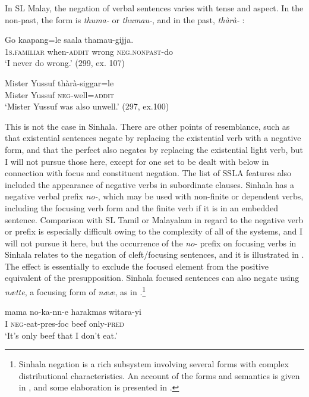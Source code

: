  In SL Malay, the negation of verbal sentences varies with tense and aspect. In the non-past, the form is \textit{thuma-} or \textit{thumau-},   and in the past, \textit{thàrà-} :


\ea\label{ex3.10.7} 
\gll Go kaapang=le saala thamau-gijja.\\
 1\textsc{s.familiar} when-\textsc{addit} wrong \textsc{neg.nonpast}-do\\
 `I never do wrong.'   (299, ex. 107)
\z


 

\ea\label{ex3.10.8}
\gll Mister Yussuf thàrà-siggar=le\\
 Mister  Yussuf \textsc{neg}-well=\textsc{addit}\\
 `Mister Yussuf was also unwell.'  (297, ex.100)
\z


This is not the case in Sinhala.
 There are other points of resemblance, such as that existential sentences negate by replacing the existential verb with a negative form, and that the perfect also negates by replacing the existential light verb, but I will not pursue those here, except for one set to be dealt with below in connection with focus and constituent negation.
 The list of SSLA features also included the appearance of negative verbs in subordinate clauses.  Sinhala has a negative verbal prefix \textit{no-}, which may be used with non-finite or dependent verbs, including the focusing verb form and the finite verb if it is in an embedded sentence. Comparison with SL Tamil or Malayalam in regard to the negative verb or prefix is especially  difficult owing to the complexity of all of the  systems, and I will not pursue it here, but the occurrence of the \textit{no}-  prefix on focusing verbs in Sinhala relates to the negation of cleft/focusing sentences, and it is illustrated in . The effect is essentially to exclude the focused element from the positive equivalent of the presupposition. Sinhala focused sentences can also negate using \textit{n{\ae}tte}, a focusing form of \textit{n{\ae}{\ae}}, as in .\footnote{Sinhala
  negation is a rich subsystem involving several forms with complex distributional characteristics. An account of the forms and semantics is given in \citet{DeAbrew1981}, and some elaboration is presented in \citet{FoleyEtAl1993}.}


\ea\label{ex3.10.9} 
\gll mama no-ka-nn-e  harakmas witara-yi\\
 I  \textsc{neg}-eat-pres-foc beef only-\textsc{pred}\\
 `It's only beef that I don't eat.'
\z




